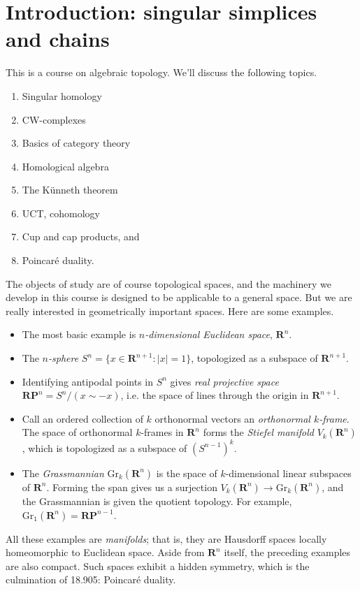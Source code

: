 
\section{Introduction: singular simplices and chains}\label{905}
This is a course on algebraic topology. 
We'll discuss the following topics. 
\begin{enumerate}
    \item Singular homology
    \item CW-complexes
    \item Basics of category theory
    \item Homological algebra
    \item The K\"{u}nneth theorem
    \item UCT, cohomology
    \item Cup and cap products, and
    \item Poincar\'{e} duality.
\end{enumerate}
The objects of study are of course topological spaces, and the machinery
we develop in this course is designed to be applicable to a general space. 
But we are really interested in geometrically important spaces. Here are 
some examples. 
\begin{itemize}
    \item The most basic example is \emph{$n$-dimensional Euclidean space}, $\mathbf{R}^n$.
    \item The \emph{$n$-sphere} $S^n=\{x\in \mathbf{R}^{n+1}:|x|=1\}$, topologized as a subspace of $\mathbf{R}^{n+1}$.
    \item Identifying antipodal points in $S^n$ gives \emph{real projective space} $\mathbf{RP}^n=S^n / (x\sim -x)$, i.e. the space of lines through the origin in $\mathbf{R}^{n+1}$.
    \item Call an ordered collection of $k$ orthonormal vectors an \emph{orthonormal $k$-frame}. The space of orthonormal $k$-frames in $\mathbf{R}^n$ forms the \emph{Stiefel manifold} $V_k(\mathbf{R}^n)$, which is topologized as a subspace of $(S^{n-1})^k$.
   \item The \emph{Grassmannian}  $\mathrm{Gr}_k(\mathbf{R}^n)$ is the space of
$k$-dimensional linear subspaces of $\mathbf{R}^n$. Forming the span gives us
a surjection $V_k(\mathbf{R}^n)\to\mathrm{Gr}_k(\mathbf{R}^n)$, and the
Grassmannian is given the quotient topology. 
For example, $\mathrm{Gr}_1(\mathbf{R}^n) = \mathbf{RP}^{n-1}$.
\end{itemize}
All these examples are \emph{manifolds}; that is, they are Hausdorff spaces locally homeomorphic to Euclidean space. Aside from $\mathbf{R}^n$ itself, the preceding examples are also compact. Such spaces exhibit a hidden symmetry, which is the culmination of 18.905: Poincar\'{e} duality.

